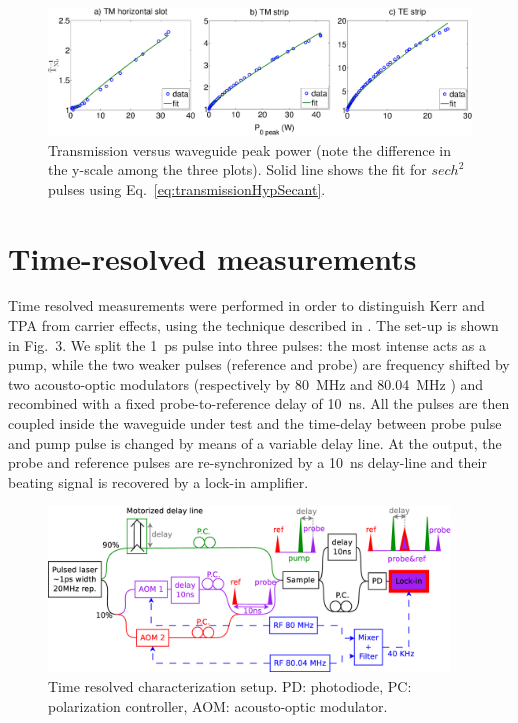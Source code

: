 \documentclass[10pt,letterpaper]{article}
\begin{document}
\begin{figure}[htb]
    \centering
    \includegraphics[width=1.0\textwidth]{imGamma_slot_TM_TE_v6}
     \caption{Transmission versus waveguide peak power (note the difference in the y-scale among the three plots). Solid line shows the fit for $ sech^2 $ pulses using Eq.~\ref{eq:transmissionHypSecant}.}
    \label{fig:imGammaSamples}
\end{figure}



\section{Time-resolved measurements}
Time resolved measurements were performed in order to distinguish Kerr and TPA from carrier effects, using the technique described in \cite{Vallaitis2008}. The set-up is shown in Fig.~3. We split the 1~ps pulse into three pulses: the most intense acts as a pump, while the two weaker pulses (reference and probe) are frequency shifted by two acousto-optic modulators (respectively by 80~MHz and 80.04~MHz ) and recombined with a fixed probe-to-reference delay of 10~ns. All the pulses are then coupled inside the waveguide under test and the time-delay between probe pulse and pump pulse is changed by means of a variable delay line. At the output, the probe and reference pulses are re-synchronized by a 10~ns delay-line and their beating signal is recovered by a lock-in amplifier.

                                \begin{figure}[htb]
                                         \centering
                                         \includegraphics[width=0.95\textwidth]{timeResolved9}
                                         \caption{Time resolved characterization setup. PD: photodiode, PC: polarization controller, AOM: acousto-optic modulator.}
                                     \label{fig:setupTimeRes}
                                \end{figure}
\end{document}

